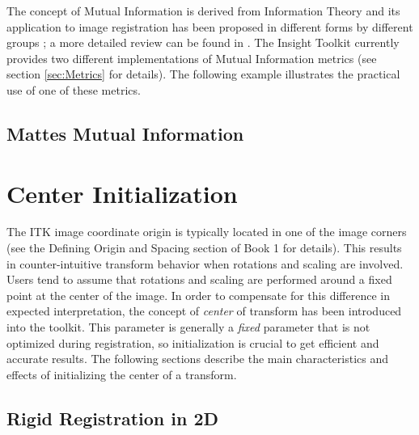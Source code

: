 
The concept of Mutual Information is derived from Information Theory and its
application to image registration has been proposed in different forms by
different groups \cite{Collignon1995,Maes97,Viola1997}; a more detailed review
can be found in \cite{Hajnal2001,Pluim2003}. The Insight Toolkit currently
provides two different implementations of Mutual Information metrics (see
section \ref{sec:Metrics} for details). The following example illustrates the
practical use of one of these metrics.

\subsection{Mattes Mutual Information}
\label{sec:MultiModalityRegistrationMattes}


% 


\section{ Center Initialization }

The ITK image coordinate origin is typically located in one of the image
corners (see the  Defining Origin and Spacing section of Book 1 for details).
This results in counter-intuitive transform behavior when rotations and scaling
are involved. Users tend to assume that rotations and scaling are performed
around a fixed point at the center of the image. In order to compensate for
this difference in expected interpretation, the concept of \emph{center} of
transform has been introduced into the toolkit. This parameter is
generally a \emph{fixed} parameter that is not optimized during
registration, so initialization is crucial to get efficient and
accurate results. The following sections describe the main
characteristics and effects of initializing the center of a
transform.

\subsection{Rigid Registration in 2D}
\label{sec:RigidRegistrationIn2D}


